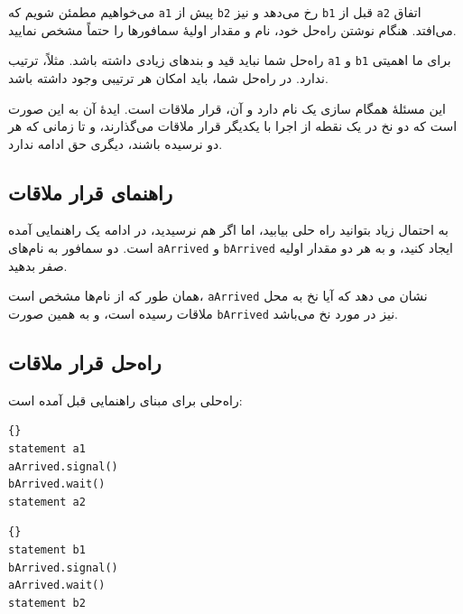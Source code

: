 \documentclass{book}
\newcommand{\clearemptydoublepage}{}%
\begin{document}
%
می‌خواهیم مطمئن شویم که \texttt{a1} پیش از \texttt{b2} رخ می‌دهد و نیز \texttt{b1} قبل از \texttt{a2} اتفاق می‌افتد. 
هنگام نوشتن راه‌حل خود، نام و مقدار اولیهٔ سمافورها را حتماً مشخص نمایید.

راه‌حل شما نباید قید و بندهای زیادی داشته باشد. مثلاً، ترتیب \texttt{a1} و \texttt{b1} برای ما اهمیتی ندارد. 
در راه‌حل شما، باید امکان هر ترتیبی وجود داشته باشد.

این مسئلهٔ همگام سازی یک نام دارد و‌ آن، قرار ملاقات است. ایدهٔ آن به این صورت است که دو نخ در یک نقطه از اجرا با یکدیگر قرار ملاقات می‌گذارند، 
و تا زمانی که هر دو نرسیده باشند، دیگری حق ادامه ندارد.


 \clearemptydoublepage
\subsection{راهنمای قرار ملاقات}
	
 به احتمال زیاد بتوانید راه حلی بیابید، اما اگر هم نرسیدید، در ادامه یک راهنمایی آمده است.
دو سمافور به نام‌های \texttt{aArrived} و \texttt{bArrived} ایجاد کنید، و به هر دو مقدار اولیه صفر بدهید. 

همان طور که از نام‌ها مشخص است، \texttt{aArrived} نشان می دهد که آیا نخ  به محل ملاقات رسیده است، 
و به همین صورت \texttt{bArrived} نیز در مورد نخ  می‌باشد.

\clearemptydoublepage
\subsection{راه‌حل قرار ملاقات }

    راه‌حلی برای مبنای راهنمایی قبل آمده است: 

\begin{latin}
\begin{minipage}[t]{2in}
\begin{latin}
\begin{lstlisting}[title=\rl{نخ \lr{A}}]{}
statement a1
aArrived.signal()
bArrived.wait()
statement a2
\end{lstlisting}
\end{latin}
\end{minipage}
\hfill
\begin{minipage}[t]{2in}
\begin{latin}
\begin{lstlisting}[title=\rl{نخ \lr{B}}]{}
statement b1
bArrived.signal()
aArrived.wait()
statement b2
\end{lstlisting}
\end{latin}
\end{minipage}
\end{latin}
\end{document}
